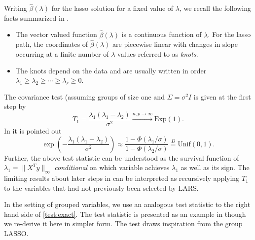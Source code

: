 \documentclass{imsart}
\begin{document}
Writing $\hat \beta(\lambda)$ for the lasso solution for a fixed value of $\lambda$, we recall
the following facts summarized in \cite{significance:lasso,tibshirani_lasso_uniqueness}.

\begin{itemize}

  \item The vector valued function $\hat \beta(\lambda)$ is a
    continuous function of $\lambda$. For the lasso path, the
    coordinates of $\hat \beta(\lambda)$ are piecewise linear with
    changes in slope occurring at a finite number of $\lambda$ values
    referred to as \emph{knots}. 
    \item The knots depend on the data and are
    usually written in order $\lambda_1 \geq \lambda_2 \geq \cdots
    \geq \lambda_r \geq 0$. 

\end{itemize}

The covariance test (assuming groups of size one and $\Sigma = \sigma^2 I$ is given at the first step by
\begin{equation}
\label{eq:covtest}
T_1 = \frac{\lambda_1(\lambda_1-\lambda_2)}{\sigma^2} \overset{n,p \to \infty}{\to} \text{Exp}(1).
\end{equation}
In \cite{tests:adaptive} it is pointed out 
\begin{equation}
\label{test:exact}
\exp\left(- \frac{\lambda_1(\lambda_1-\lambda_2)}{\sigma^2} \right) \approx \frac{1 - \Phi(\lambda_1/\sigma)}{1 - \Phi(\lambda_2 / \sigma)} \overset{D}{=} \text{Unif}(0,1).
\end{equation}
Further, the above test statistic can be understood as the survival function of $\lambda_1 = \|X^Ty\|_{\infty}$
{\em conditional} on which variable achieves $\lambda_1$ as well as its sign.
The limiting results about later steps in \cite{significance:lasso} can
be interpreted as
recursively applying $T_1$ to the variables that had not previously been selected by LARS.

In the setting of grouped variables, we use an analogous test statistic to
the right hand side of \eqref{test:exact}. The test statistic is presented as an example
in \cite{tests:adaptive} though we re-derive it here in simpler form. The test draws inspiration
from the group LASSO.
\end{document}
